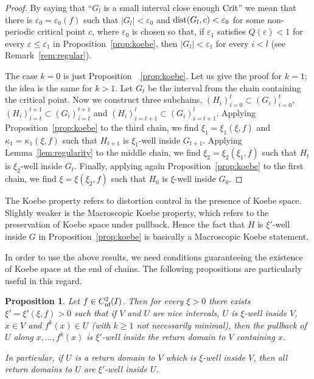 \documentclass[12pt, psamsfonts, reqno]{amsart}
\newtheorem{proposition}[theorem]{Proposition}
\begin{document}
\begin{proof}
By saying that ``$G_l$ is a small interval close enough ${\mathop{\rm Crit}\nolimits}$''
we mean that there is ${\varepsilon}_0={\varepsilon}_0(f)$ such that  $|G_l|<{\varepsilon}_0$
and ${\mathop{\rm dist}\nolimits}(G_l,c)<{\varepsilon}_0$ for some non-periodic critical point
$c$, where ${\varepsilon}_0$ is chosen so that, if ${\varepsilon}_1$  satisfies
$Q({\varepsilon})<1$ for every ${\varepsilon}\leq {\varepsilon}_1$ in
Proposition~\ref{prop:koebe}, then  $|G_i|<{\varepsilon}_1$ for every $i<l$
(see Remark~\ref{rem:regular}).

The case $k=0$ is just Proposition~~\ref{prop:koebe}. Let us give
the proof for $k=1$; the idea is the same for $k
> 1$. Let  $G_t$ be the interval from the chain containing the
critical point. Now we construct three subchains,
$(H_i)_{i=0}^t\subset (G_i)_{i=0}^t$, $(H_i)_{i=t}^{t+1}\subset
(G_i)_{i=t}^{t+1}$ and $(H_i)_{i=t+1}^l\subset (G_i)_{i=t+1}^l$.
Applying Proposition~\ref{prop:koebe} to the third chain, we find
$\xi_1=\xi_1(\xi,f)$ and $\kappa_1=\kappa_1(\xi,f)$  such that
$H_{t+1}$ is $\xi_1$-well inside $G_{t+1}$. Applying
Lemma~\ref{lem:regularity} to the middle chain, we find
$\xi_2=\xi_2(\xi_1,f)$ such that $H_t$ is $\xi_2$-well inside
$G_t$. Finally, applying again Proposition~\ref{prop:koebe} to the
first chain, we find $\xi=\xi(\xi_2,f)$ such that $H_0$ is
$\xi$-well inside $G_0$.
\end{proof}

The Koebe property refers to distortion control in the presence of
Koebe space. Slightly weaker is the Macroscopic Koebe property,
which refers to the preservation of Koebe space under pullback.
Hence the fact that $H$ is $\xi'$-well inside $G$ in
Proposition~\ref{prop:koebe} is basically a Macroscopic Koebe
statement.

In order to use the above results, we need conditions guaranteeing
the existence of Koebe space at the end of chains. The following
propositions are particularly useful in this regard.

\begin{proposition}
 \label{macroscopickoebe}
 Let $f\in {C^2_{\text{\rm nf}}}(I)$.
 Then for every $\xi>0$ there exists $\xi'=\xi'(\xi,f)>0$ such that if
 $V$  and $U$ are nice intervals,
 $U$ is $\xi$-well inside $V$,
 $x\in V$
 and $f^k(x)\in U$ (with $k\geq 1$ not necessarily minimal),
 then the pullback of $U$ along $x,\ldots,f^k(x)$ is
 $\xi'$-well inside the return domain to $V$ containing $x$.

 In particular, if $U$ is a return domain
 to $V$ which is $\xi$-well inside $V$, then
 all return domains to $U$ are $\xi'$-well inside
 $U$.
\end{proposition}
\end{document}
